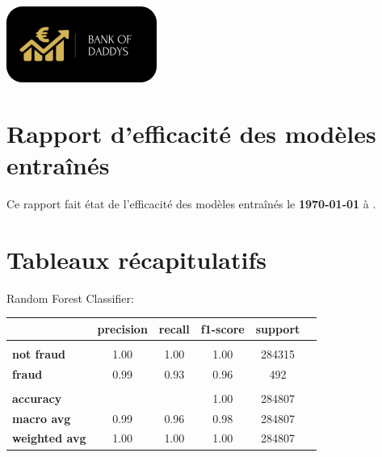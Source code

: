 \documentclass[10pt,a4paper]{article}
\begin{document}
\begin{center}
\includegraphics[scale=1]{../views/img/background_splash} 
\end{center}
\section{Rapport d'efficacité des modèles entraînés }
\flushleft
\bigbreak  
\bigbreak  
Ce rapport fait état de l'efficacité des modèles entraînés le \textbf {\today{}}  à  \textbf {\DTMcurrenttime{}}.
\bigbreak  
\section{Tableaux récapitulatifs}
\flushleft
\bigbreak  
\bigbreak  
\large{ Random Forest Classifier:}
\flushleft
\bigbreak  
\normalsize
\begin{center}
\begin{tabular}{ l | c  c  c  c  c  }
 & \textbf{precision} & \textbf {recall} & \textbf {f1-score} & \textbf {support}\\
\hline
& & & &\\
\textbf {not fraud} & 1.00 & 1.00 & 1.00 & 284315 \\
\textbf {fraud} & 0.99 & 0.93 & 0.96 & 492\\
& & & &\\
\textbf {accuracy} &  & & 1.00 & 284807\\
\textbf {macro avg} & 0.99 & 0.96 & 0.98 & 284807\\
\textbf {weighted avg} & 1.00 & 1.00 & 1.00 & 284807\\
\end{tabular}
\end{center}
\end{document}
